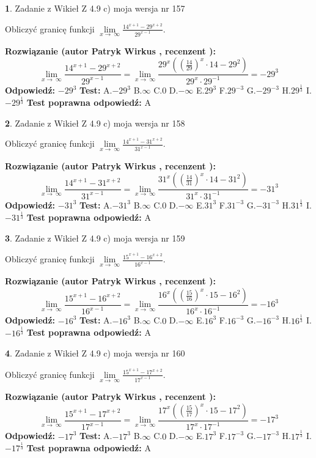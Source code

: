 \documentclass[12pt, a4paper]{article}
\theoremstyle{definition} %
\newtheorem{zad}{}
\newcommand{\zadStart}[1]{\begin{zad}#1\newline}
\newcommand{\zadStop}{\end{zad}}
\newcommand{\rozwStart}[2]{\noindent \textbf{Rozwiązanie (autor #1 , recenzent #2): }\newline}
\newcommand{\rozwStop}{\newline}
\newcommand{\odpStart}{\noindent \textbf{Odpowiedź:}\newline}
\newcommand{\odpStop}{\newline}
\newcommand{\testStart}{\noindent \textbf{Test:}\newline}
\newcommand{\testStop}{\newline}
\newcommand{\kluczStart}{\noindent \textbf{Test poprawna odpowiedź:}\newline}
\newcommand{\kluczStop}{\newline}
\begin{document}
\zadStart{Zadanie z Wikieł Z 4.9 c) moja wersja nr 157}


Obliczyć granicę funkcji  $\lim\limits_{x\to\ \infty}\frac{14^{x+1}-29^{x+2}}{29^{x-1}}$.
\zadStop
\rozwStart{Patryk Wirkus}{}
$$\lim\limits_{x\to\ \infty}\frac{14^{x+1}-29^{x+2}}{29^{x-1}}=\lim\limits_{x\to\ \infty}\frac{29^{x}((\frac{14}{29})^{x}\cdot 14 -29^{2})}{29^{x}\cdot 29^{-1}} = -29^{3}$$
\rozwStop
\odpStart
$-29^{3}$
\odpStop
\testStart
A.$-29^{3}$ B.$\infty$ C.$0$ D.$-\infty$ E.$29^{3}$
F.$29^{-3}$ G.$-29^{-3}$
H.$29^{\frac{1}{3}}$
I.$-29^{\frac{1}{3}}$
\testStop
\kluczStart
A
\kluczStop



\zadStart{Zadanie z Wikieł Z 4.9 c) moja wersja nr 158}


Obliczyć granicę funkcji  $\lim\limits_{x\to\ \infty}\frac{14^{x+1}-31^{x+2}}{31^{x-1}}$.
\zadStop
\rozwStart{Patryk Wirkus}{}
$$\lim\limits_{x\to\ \infty}\frac{14^{x+1}-31^{x+2}}{31^{x-1}}=\lim\limits_{x\to\ \infty}\frac{31^{x}((\frac{14}{31})^{x}\cdot 14 -31^{2})}{31^{x}\cdot 31^{-1}} = -31^{3}$$
\rozwStop
\odpStart
$-31^{3}$
\odpStop
\testStart
A.$-31^{3}$ B.$\infty$ C.$0$ D.$-\infty$ E.$31^{3}$
F.$31^{-3}$ G.$-31^{-3}$
H.$31^{\frac{1}{3}}$
I.$-31^{\frac{1}{3}}$
\testStop
\kluczStart
A
\kluczStop



\zadStart{Zadanie z Wikieł Z 4.9 c) moja wersja nr 159}


Obliczyć granicę funkcji  $\lim\limits_{x\to\ \infty}\frac{15^{x+1}-16^{x+2}}{16^{x-1}}$.
\zadStop
\rozwStart{Patryk Wirkus}{}
$$\lim\limits_{x\to\ \infty}\frac{15^{x+1}-16^{x+2}}{16^{x-1}}=\lim\limits_{x\to\ \infty}\frac{16^{x}((\frac{15}{16})^{x}\cdot 15 -16^{2})}{16^{x}\cdot 16^{-1}} = -16^{3}$$
\rozwStop
\odpStart
$-16^{3}$
\odpStop
\testStart
A.$-16^{3}$ B.$\infty$ C.$0$ D.$-\infty$ E.$16^{3}$
F.$16^{-3}$ G.$-16^{-3}$
H.$16^{\frac{1}{3}}$
I.$-16^{\frac{1}{3}}$
\testStop
\kluczStart
A
\kluczStop



\zadStart{Zadanie z Wikieł Z 4.9 c) moja wersja nr 160}


Obliczyć granicę funkcji  $\lim\limits_{x\to\ \infty}\frac{15^{x+1}-17^{x+2}}{17^{x-1}}$.
\zadStop
\rozwStart{Patryk Wirkus}{}
$$\lim\limits_{x\to\ \infty}\frac{15^{x+1}-17^{x+2}}{17^{x-1}}=\lim\limits_{x\to\ \infty}\frac{17^{x}((\frac{15}{17})^{x}\cdot 15 -17^{2})}{17^{x}\cdot 17^{-1}} = -17^{3}$$
\rozwStop
\odpStart
$-17^{3}$
\odpStop
\testStart
A.$-17^{3}$ B.$\infty$ C.$0$ D.$-\infty$ E.$17^{3}$
F.$17^{-3}$ G.$-17^{-3}$
H.$17^{\frac{1}{3}}$
I.$-17^{\frac{1}{3}}$
\testStop
\kluczStart
A
\kluczStop
\end{document}
